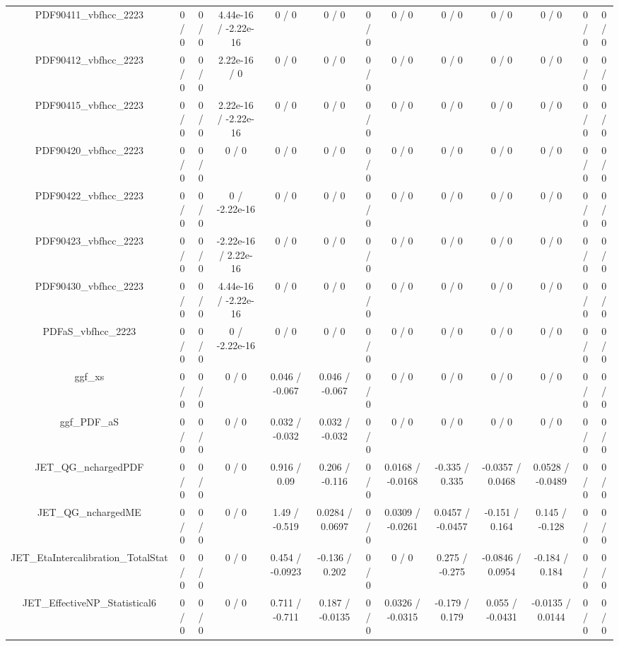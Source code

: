 \documentclass[10pt]{article}
\begin{document}
\begin{table}[htbp]
\begin{center}
\begin{tabular}{|c|c|c|c|c|c|c|c|c|c|c|c|c|}
  PDF90411_vbfhcc_2223 & 0 / 0 & 0 / 0 & 4.44e-16 / -2.22e-16 & 0 / 0 & 0 / 0 & 0 / 0 & 0 / 0 & 0 / 0 & 0 / 0 & 0 / 0 & 0 / 0 & 0 / 0 \\ 
  PDF90412_vbfhcc_2223 & 0 / 0 & 0 / 0 & 2.22e-16 / 0 & 0 / 0 & 0 / 0 & 0 / 0 & 0 / 0 & 0 / 0 & 0 / 0 & 0 / 0 & 0 / 0 & 0 / 0 \\ 
  PDF90415_vbfhcc_2223 & 0 / 0 & 0 / 0 & 2.22e-16 / -2.22e-16 & 0 / 0 & 0 / 0 & 0 / 0 & 0 / 0 & 0 / 0 & 0 / 0 & 0 / 0 & 0 / 0 & 0 / 0 \\ 
  PDF90420_vbfhcc_2223 & 0 / 0 & 0 / 0 & 0 / 0 & 0 / 0 & 0 / 0 & 0 / 0 & 0 / 0 & 0 / 0 & 0 / 0 & 0 / 0 & 0 / 0 & 0 / 0 \\ 
  PDF90422_vbfhcc_2223 & 0 / 0 & 0 / 0 & 0 / -2.22e-16 & 0 / 0 & 0 / 0 & 0 / 0 & 0 / 0 & 0 / 0 & 0 / 0 & 0 / 0 & 0 / 0 & 0 / 0 \\ 
  PDF90423_vbfhcc_2223 & 0 / 0 & 0 / 0 & -2.22e-16 / 2.22e-16 & 0 / 0 & 0 / 0 & 0 / 0 & 0 / 0 & 0 / 0 & 0 / 0 & 0 / 0 & 0 / 0 & 0 / 0 \\ 
  PDF90430_vbfhcc_2223 & 0 / 0 & 0 / 0 & 4.44e-16 / -2.22e-16 & 0 / 0 & 0 / 0 & 0 / 0 & 0 / 0 & 0 / 0 & 0 / 0 & 0 / 0 & 0 / 0 & 0 / 0 \\ 
  PDFaS_vbfhcc_2223 & 0 / 0 & 0 / 0 & 0 / -2.22e-16 & 0 / 0 & 0 / 0 & 0 / 0 & 0 / 0 & 0 / 0 & 0 / 0 & 0 / 0 & 0 / 0 & 0 / 0 \\ 
  ggf_xs & 0 / 0 & 0 / 0 & 0 / 0 & 0.046 / -0.067 & 0.046 / -0.067 & 0 / 0 & 0 / 0 & 0 / 0 & 0 / 0 & 0 / 0 & 0 / 0 & 0 / 0 \\ 
  ggf_PDF_aS & 0 / 0 & 0 / 0 & 0 / 0 & 0.032 / -0.032 & 0.032 / -0.032 & 0 / 0 & 0 / 0 & 0 / 0 & 0 / 0 & 0 / 0 & 0 / 0 & 0 / 0 \\ 
  JET_QG_nchargedPDF & 0 / 0 & 0 / 0 & 0 / 0 & 0.916 / 0.09 & 0.206 / -0.116 & 0 / 0 & 0.0168 / -0.0168 & -0.335 / 0.335 & -0.0357 / 0.0468 & 0.0528 / -0.0489 & 0 / 0 & 0 / 0 \\ 
  JET_QG_nchargedME & 0 / 0 & 0 / 0 & 0 / 0 & 1.49 / -0.519 & 0.0284 / 0.0697 & 0 / 0 & 0.0309 / -0.0261 & 0.0457 / -0.0457 & -0.151 / 0.164 & 0.145 / -0.128 & 0 / 0 & 0 / 0 \\ 
  JET_EtaIntercalibration_TotalStat & 0 / 0 & 0 / 0 & 0 / 0 & 0.454 / -0.0923 & -0.136 / 0.202 & 0 / 0 & 0 / 0 & 0.275 / -0.275 & -0.0846 / 0.0954 & -0.184 / 0.184 & 0 / 0 & 0 / 0 \\ 
  JET_EffectiveNP_Statistical6 & 0 / 0 & 0 / 0 & 0 / 0 & 0.711 / -0.711 & 0.187 / -0.0135 & 0 / 0 & 0.0326 / -0.0315 & -0.179 / 0.179 & 0.055 / -0.0431 & -0.0135 / 0.0144 & 0 / 0 & 0 / 0 \\ 

\end{tabular}
\end{center}
\end{table}
\end{document}
